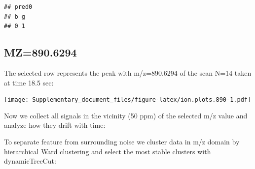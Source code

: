 \documentclass[]{article}
\newenvironment{Shaded}{\begin{snugshade}}{\end{snugshade}}
\newcommand{\KeywordTok}[1]{\textcolor[rgb]{0.13,0.29,0.53}{\textbf{#1}}}
\newcommand{\FloatTok}[1]{\textcolor[rgb]{0.00,0.00,0.81}{#1}}
\newcommand{\StringTok}[1]{\textcolor[rgb]{0.31,0.60,0.02}{#1}}
\newcommand{\OperatorTok}[1]{\textcolor[rgb]{0.81,0.36,0.00}{\textbf{#1}}}
\newcommand{\NormalTok}[1]{#1}
\begin{document}
\begin{verbatim}
## pred0
## b g 
## 0 1
\end{verbatim}

\subsection{MZ=890.6294}\label{mz890.6294}

\begin{Shaded}
\end{Shaded}

The selected row represents the peak with m/z=890.6294 of the scan N=14
taken at time 18.5 sec:

\begin{Shaded}
\end{Shaded}

\texttt{[image: Supplementary\_document\_files/figure-latex/ion.plots.890-1.pdf]}

Now we collect all signals in the vicinity (50 ppm) of the selected m/z
value and analyze how they drift with time:

\begin{Shaded}
\end{Shaded}

To separate feature from surrounding noise we cluster data in m/z domain
by hierarchical Ward clustering and select the most stable clusters with
dynamicTreeCut:
\end{document}
